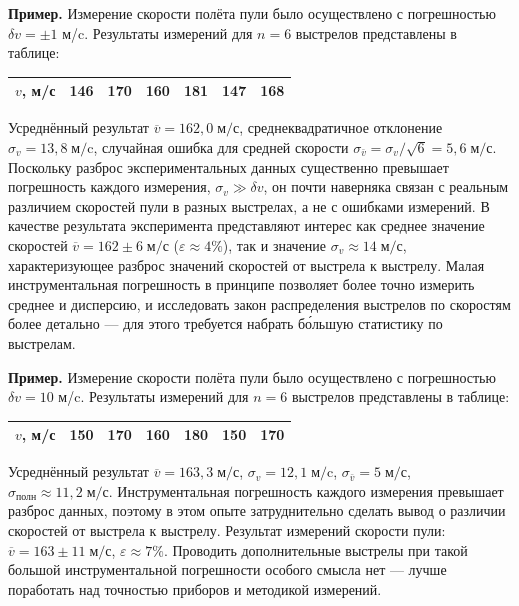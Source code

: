 \documentclass[10pt]{article}
\begin{document}
{\footnotesize
\textbf{Пример.} Измерение скорости
полёта пули было осуществлено с погрешностью $\delta v=\pm1$ м/c.
Результаты измерений для $n=6$ выстрелов представлены в таблице:\par
\begin{tabular}{|c|c|c|c|c|c|c|}
\hline 
{\footnotesize{}$v$, м/с} & {\footnotesize{}146} & {\footnotesize{}170} & {\footnotesize{}160} & {\footnotesize{}181} & {\footnotesize{}147} & {\footnotesize{}168}\tabularnewline
\hline 
\end{tabular}\par
Усреднённый результат $\overline{v}=162{,}0\;\text{м/с}$,
среднеквадратичное отклонение $\sigma_{v}=13{,}8\;\text{м/c}$, случайная
ошибка для средней скорости $\sigma_{\bar{v}}=\sigma_{v}/\sqrt{6}=5{,}6\;\text{м/с}$.
Поскольку разброс экспериментальных данных существенно превышает погрешность
каждого измерения, $\sigma_{v}\gg\delta v$, он почти наверняка связан
с реальным различием скоростей пули в разных выстрелах, а не с ошибками
измерений. В качестве результата эксперимента представляют интерес
как среднее значение скоростей $\overline{v}=162\pm6\;\text{м/с}$
($\varepsilon\approx4\%$), так и значение $\sigma_{v}\approx14\;\text{м/с}$,
характеризующее разброс значений скоростей от выстрела к выстрелу.
Малая инструментальная погрешность в принципе позволяет более точно
измерить среднее и дисперсию, и исследовать закон распределения выстрелов
по скоростям более детально --- для этого требуется набрать
б\'{о}льшую статистику по выстрелам.\par
}%

{\footnotesize
\textbf{Пример.} Измерение скорости
полёта пули было осуществлено с погрешностью $\delta v=10$ м/c. Результаты
измерений для $n=6$ выстрелов представлены в таблице:\par
\begin{tabular}{|c|c|c|c|c|c|c|}
\hline 
{\footnotesize{}$v$, м/с} & {\footnotesize{}150} & {\footnotesize{}170} & {\footnotesize{}160} & {\footnotesize{}180} & {\footnotesize{}150} & {\footnotesize{}170}\tabularnewline
\hline 
\end{tabular}\par
Усреднённый результат $\overline{v}=163{,}3\;\text{м/с}$,
$\sigma_{v}=12{,}1\;\text{м/c}$, $\sigma_{\bar{v}}=5\;\text{м/с}$,
$\sigma_{\text{полн}}\approx11{,}2\;\text{м/с}$. Инструментальная
погрешность каждого измерения превышает разброс данных, поэтому в
этом опыте затруднительно сделать вывод о различии скоростей от выстрела
к выстрелу. Результат измерений скорости пули: $\overline{v}=163\pm11\;\text{м/с}$,
$\varepsilon\approx7\%$. Проводить дополнительные выстрелы при такой
большой инструментальной погрешности особого смысла нет ---
лучше поработать над точностью приборов и методикой измерений.\par
}%
\end{document}
